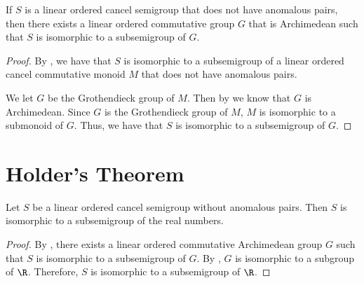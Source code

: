 \begin{theorem}\label{to_arch_group}
    \leanok
    If $S$ is a linear ordered cancel semigroup
    that does not have anomalous pairs, then
    there exists a linear ordered commutative group $G$
    that is Archimedean
    such that $S$ is isomorphic to a subsemigroup of $G$.
\end{theorem}
\begin{proof}\leanok
By , we have that
$S$ is isomorphic to a subsemigroup of a
linear ordered cancel commutative monoid $M$ that
does not have anomalous pairs.

We let $G$ be the Grothendieck group of $M$.
Then by  we know that $G$
is Archimedean. Since $G$ is the Grothendieck group of $M$,
$M$ is isomorphic to a submonoid of $G$. Thus,
we have that $S$ is isomorphic to a subsemigroup of $G$.
\end{proof}

\section{Holder's Theorem}

\begin{theorem}\label{holder_not_anom}
    \leanok
    Let $S$ be a linear ordered cancel semigroup
    without anomalous pairs. Then $S$ is isomorphic
    to a subsemigroup of the real numbers.
\end{theorem}
\begin{proof}\leanok
By , there exists a linear ordered commutative
Archimedean group $G$
such that $S$ is isomorphic to a subsemigroup of $G$.
By , $G$ is isomorphic to a subgroup of $\R$.
Therefore, $S$ is isomorphic to a subsemigroup of $\R$.
\end{proof}

